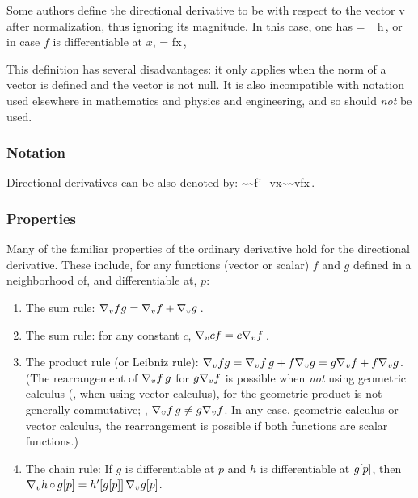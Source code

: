 Some authors define the directional derivative to be with respect to the vector v after normalization, thus ignoring its magnitude. In this case, one has
\beq
{} = \lim_{h}\,,
\eeq
or in case $f$ is differentiable at $x$,
\beq
{} = \gder f\vat x\iprod {}\,,
\eeq

This definition has several disadvantages: it only applies when the norm of a vector is defined and the vector is not null. It is also incompatible with notation used elsewhere in mathematics and physics and engineering, and so should \emph{not} be used.


\subsubsection{Notation}
Directional derivatives can be also denoted by:
\beq
{}\sim {}\sim f'_{v}\vat x\sim {}\sim v\iprod\gder f\vat x\,.
\eeq


\subsubsection{Properties}
Many of the familiar properties of the ordinary derivative hold for the directional derivative. These include, for any functions (vector or scalar) $f$ and $g$ defined in a neighborhood of, and differentiable at, $p$:
\begin{enumerate}
\item The sum rule: $\dder{fg}{v} = \dder{f}{v} + \dder{g}{v}$\,.
%
\item The sum rule: for any constant $c$, $\dder{cf}{v} = c\dder{f}{v}$\,.
%
\item The product rule (or Leibniz rule): $\dder{fg}{v} = \dder{f}{v}\,g + f\dder{g}{v} = g\dder{f}{v} + f\dder{g}{v}$. (The rearrangement of $\dder{f}{v}\,g$ for $g\dder{f}{v}$ is possible when \emph{not} using geometric calculus (\ie, when using vector calculus), for the geometric product is not generally commutative; \viz, $\dder{f}{v}\,g\neq g\dder{f}{v}$. In any case, geometric calculus or vector calculus, the rearrangement is possible if both functions are scalar functions.)
%
\item The chain rule: If $g$ is differentiable at $p$ and $h$ is differentiable at $g\vat p$, then $\dder{h\fcomp g}{v}\vat p = h'\vat{g\vat p}\dder{g\vat p}{v}$.
\end{enumerate}


